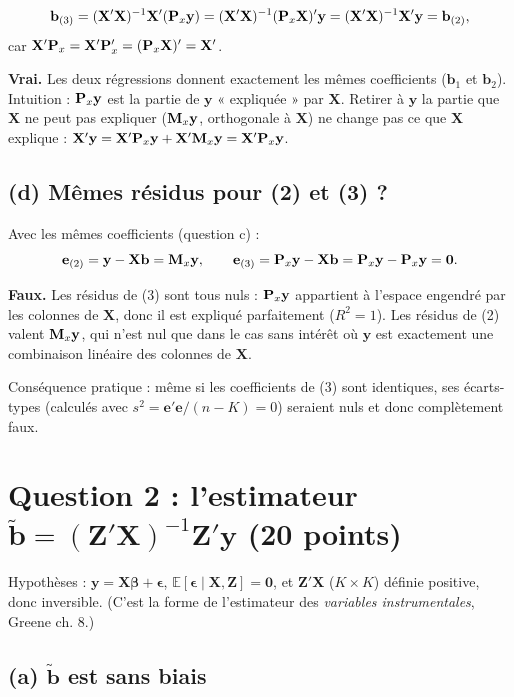 \documentclass[11pt,a4paper]{article}
\newcommand{\vy}{\mathbf{y}}\newcommand{\vX}{\mathbf{X}}\newcommand{\vZ}{\mathbf{Z}}
\newcommand{\ve}{\mathbf{e}}\newcommand{\vb}{\mathbf{b}}\newcommand{\vx}{\mathbf{x}}
\newcommand{\vbeta}{\bm{\beta}}\newcommand{\veps}{\bm{\epsilon}}\newcommand{\vi}{\bm{\iota}}
\newcommand{\tb}{\tilde{\mathbf{b}}}
\newcommand{\E}{\mathbb{E}}\newcommand{\Var}{\operatorname{Var}}\newcommand{\Cov}{\operatorname{Cov}}
\begin{document}
\[
\vb_{(3)}=(\vX'\vX)^{-1}\vX'(\Pm_x\vy)=(\vX'\vX)^{-1}(\Pm_x\vX)'\vy=(\vX'\vX)^{-1}\vX'\vy=\vb_{(2)},
\]
car $\vX'\Pm_x=\vX'\Pm_x'=(\Pm_x\vX)'=\vX'$.

\begin{reponse}
\textbf{Vrai.} Les deux régressions donnent exactement les mêmes coefficients ($\vb_1$ et $\vb_2$). Intuition : $\Pm_x\vy$ est la partie de $\vy$ « expliquée » par $\vX$. Retirer à $\vy$ la partie que $\vX$ ne peut pas expliquer ($\Mm_x\vy$, orthogonale à $\vX$) ne change pas ce que $\vX$ explique : $\vX'\vy=\vX'\Pm_x\vy+\vX'\Mm_x\vy=\vX'\Pm_x\vy$.
\end{reponse}

\subsection*{(d) Mêmes résidus pour (2) et (3) ?}

Avec les mêmes coefficients (question c) :
\[
\ve_{(2)}=\vy-\vX\vb=\Mm_x\vy,\qquad
\ve_{(3)}=\Pm_x\vy-\vX\vb=\Pm_x\vy-\Pm_x\vy=\mathbf 0 .
\]

\begin{reponse}
\textbf{Faux.} Les résidus de (3) sont tous nuls : $\Pm_x\vy$ appartient à l'espace engendré par les colonnes de $\vX$, donc il est expliqué parfaitement ($R^2=1$). Les résidus de (2) valent $\Mm_x\vy$, qui n'est nul que dans le cas sans intérêt où $\vy$ est exactement une combinaison linéaire des colonnes de $\vX$.

Conséquence pratique : même si les coefficients de (3) sont identiques, ses écarts-types (calculés avec $s^2=\ve'\ve/(n-K)=0$) seraient nuls et donc complètement faux.
\end{reponse}

\section{Question 2 : l'estimateur $\tb=(\vZ'\vX)^{-1}\vZ'\vy$ (20 points)}

Hypothèses : $\vy=\vX\vbeta+\veps$, $\E[\veps\mid\vX,\vZ]=\mathbf 0$, et $\vZ'\vX$ ($K\times K$) définie positive, donc inversible. (C'est la forme de l'estimateur des \emph{variables instrumentales}, Greene ch. 8.)

\subsection*{(a) $\tb$ est sans biais}
\end{document}
